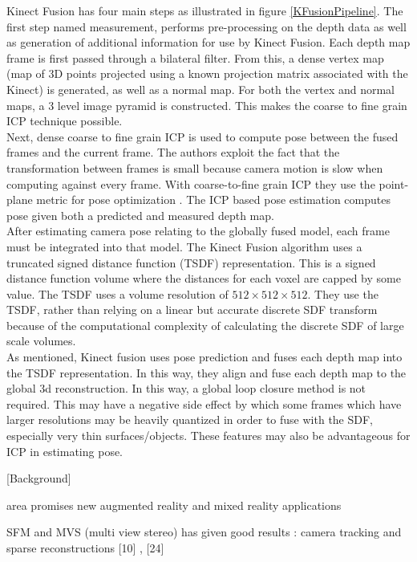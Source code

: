 Kinect Fusion has four main steps as illustrated in figure \ref{KFusionPipeline}. The first step named measurement, performs pre-processing on the depth data as well as generation of additional information for use by Kinect Fusion. Each depth map frame is first passed through a bilateral filter. From this, a dense vertex map (map of 3D points projected using a known projection matrix associated with the Kinect) is generated, as well as a normal map. For both the vertex and normal maps, a 3 level image pyramid is constructed. This makes the coarse to fine grain ICP technique possible. \\

Next, dense coarse to fine grain ICP is used to compute pose between the fused frames and the current frame. The authors exploit the fact that the transformation between frames is small because camera motion is slow when computing against every frame. With coarse-to-fine grain ICP they use the point-plane metric for pose optimization \cite{Rusinkiewicz02Real}. The ICP based pose estimation computes pose given both a predicted and measured depth map. \\

After estimating camera pose relating to the globally fused model, each frame must be integrated into that model. The Kinect Fusion algorithm uses a truncated signed distance function (TSDF) representation. This is a signed distance function volume where the distances for each voxel are capped by some value. The TSDF uses a volume resolution of $512\times 512\times 512$. They use the TSDF, rather than relying on a linear but accurate discrete SDF transform \cite{Rasch09Remarks} because of the computational complexity of calculating the discrete SDF of large scale volumes. \\

As mentioned, Kinect fusion uses pose prediction and fuses each depth map into the TSDF representation. In this way, they align and fuse each depth map to the global 3d reconstruction. In this way, a global loop closure method is not required. This may have a negative side effect by which some frames which have larger resolutions may be heavily quantized in order to fuse with the SDF, especially very thin surfaces/objects. These features may also be advantageous for ICP in estimating pose. 

[Background]

area promises new augmented reality and mixed reality applications

SFM and MVS (multi view stereo) has given good results : camera tracking  and sparse reconstructions [10] \cite{Fitzgibbon98Automatic}, \cite{Seitz06Comparison} [24] 

